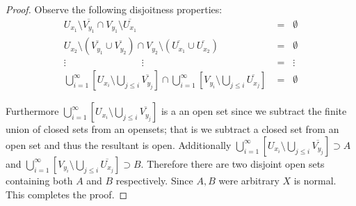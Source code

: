 \documentclass[11pt]{amsart}
\theoremstyle{definition}
\numberwithin{theorem}{section}
\numberwithin{definition}{section}
\numberwithin{equation}{section}
\begin{document}
\begin{itemize}
\begin{proof}
		Observe the following disjoitness properties:
		\begin{equation*}
			\begin{aligned}
				U_{x_1} \setminus \overline{V_{y_1}} \cap V_{y_1} \setminus \overline{U_{x_1}} &=\;\; \emptyset \\
				U_{x_2} \setminus (\overline{V_{y_1}} \cup \overline{V_{y_2}}) \cap V_{y_2} \setminus (\overline{U_{x_1}} \cup \overline{U_{x_2}}) &= \;\;\emptyset\\
				\vdots \;\;\;\;\;\;\;\;\;\;\;\;\;\;\;\;\;\;\;\;\;\;\;\;\;\;\;\;\vdots\;\;\;\;\;\;\;\;\;&= \;\;\vdots \\
				\bigcup_{i=1}^\infty \left[U_{x_i} \setminus \bigcup_{j \leq i} \overline{V_{y_j}}\right] \cap \bigcup_{i=1}^\infty \left[V_{y_i} \setminus \bigcup_{j \leq i} \overline{U_{x_j}}\right] &=\;\; \emptyset
			\end{aligned}
		\end{equation*}

		Furthermore $\bigcup_{i=1}^\infty [U_{x_i} \setminus \bigcup_{j \leq i} \overline{V_{y_j}}]$ is a an open set since we subtract the finite union of closed sets from an opensets; that is we subtract a closed set from an open set and thus the resultant is open. Additionally $\bigcup_{i=1}^\infty \left[U_{x_i} \setminus \bigcup_{j \leq i} \overline{V_{y_j}}\right] \supset A$ and $ \bigcup_{i=1}^\infty \left[V_{y_i} \setminus \bigcup_{j \leq i} \overline{U_{x_j}}\right] \supset B$. Therefore there are two disjoint open sets containing both $A$ and $B$ respectively. Since $A,B$ were arbitrary $X$ is normal. This completes the proof.
	\end{proof}



\end{itemize}
\end{document}
